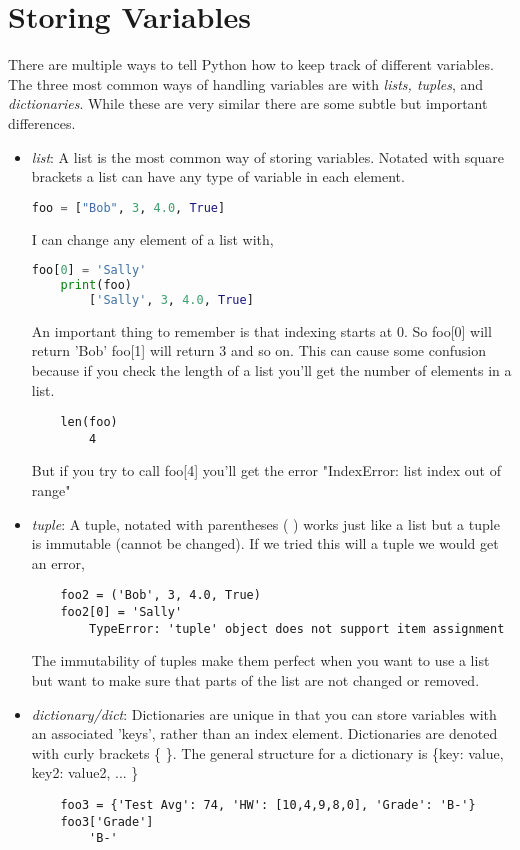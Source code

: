 \documentclass[12pt]{book}
\newcommand\tab[1][0.5cm]{\hspace*{#1}}
\begin{document}
	\section{Storing Variables}
	\tab There are multiple ways to tell Python how to keep track of different variables. The three most common ways of handling variables are with \textit{lists, tuples}, and \textit{dictionaries}. While these are very similar there are some subtle but important differences.
	\begin{itemize}
		\item \textit{list}: A list is the most common way of storing variables. Notated with square brackets \text{[ ]} a list can have any type of variable in each element.
	\begin{lstlisting}[language=Python]
	foo = ["Bob", 3, 4.0, True]
	\end{lstlisting}
		I can change any element of a list with,
	\begin{lstlisting}[language=Python]
	foo[0] = 'Sally'
	print(foo)
		['Sally', 3, 4.0, True]
	\end{lstlisting}
		An important thing to remember is that indexing starts at 0. So foo[0] will return 'Bob' foo[1] will return 3 and so on. This can cause some confusion because if you check the length of a list you'll get the number of elements in a list.
	\begin{lstlisting}
	len(foo)
		4 
	\end{lstlisting}
	But if you try to call foo[4] you'll get the error "IndexError: list index out of range"
	
	\item \textit{tuple}: A tuple, notated with parentheses ( ) works just like a list but a tuple is immutable (cannot be changed). 
	If we tried this will a tuple we would get an error,
	\begin{lstlisting}
	foo2 = ('Bob', 3, 4.0, True)
	foo2[0] = 'Sally'
		TypeError: 'tuple' object does not support item assignment
	\end{lstlisting}
	The immutability of tuples make them perfect when you want to use a list but want to make sure that parts of the list are not changed or removed.
	
	\item \textit{dictionary/dict}: Dictionaries are unique in that you can store variables with an associated 'keys', rather than an index element. Dictionaries are denoted with curly brackets \{ \}. The general structure for a dictionary is \{key: value, key2: value2, ... \}
	\begin{lstlisting}
	foo3 = {'Test Avg': 74, 'HW': [10,4,9,8,0], 'Grade': 'B-'} 
	foo3['Grade']
		'B-'
	\end{lstlisting}
	\end{itemize}
	
\end{document}
